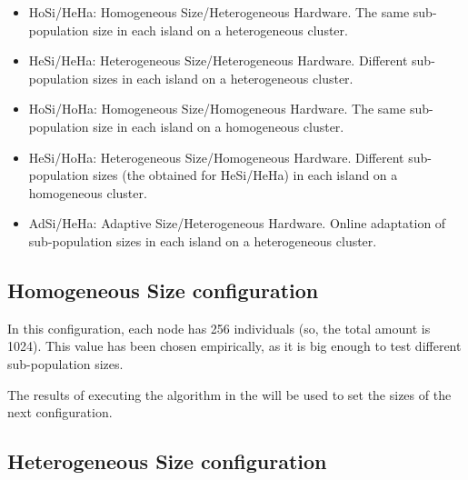 \begin{itemize}
\item HoSi/HeHa: Homogeneous Size/Heterogeneous Hardware. The same sub-population size in each island on a heterogeneous cluster.
\item HeSi/HeHa: Heterogeneous Size/Heterogeneous Hardware. Different
  sub-population sizes in each island on a heterogeneous cluster. %
\item HoSi/HoHa: Homogeneous Size/Homogeneous Hardware. The same
  sub-population size in each island on a homogeneous cluster. %
\item HeSi/HoHa: Heterogeneous Size/Homogeneous Hardware. Different sub-population sizes (the obtained for HeSi/HeHa) in each island on a homogeneous cluster.

\item AdSi/HeHa: Adaptive Size/Heterogeneous Hardware. Online adaptation of sub-population sizes in each island on a heterogeneous cluster.
\end{itemize} %



\subsection{Homogeneous Size configuration}

In this configuration, each node has 256 individuals (so, the total
amount is 1024). This value has been chosen empirically, as it is big enough to test different sub-population sizes.  %

The results of executing the algorithm in the will be used to set the sizes of the next configuration.






\subsection{Heterogeneous Size configuration}


